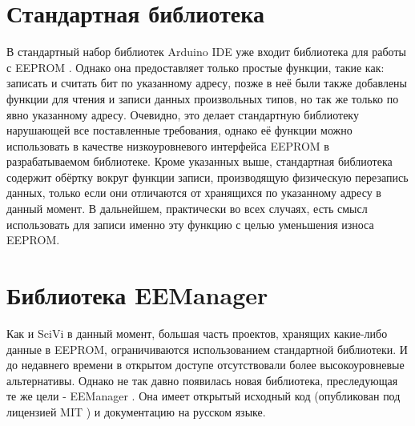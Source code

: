 \section{Стандартная библиотека}

В стандартный набор библиотек Arduino IDE уже входит библиотека для работы с EEPROM \cite{web:arduino-eeprom}.
Однако она предоставляет только простые функции, такие как: записать и считать бит по указанному адресу, позже в неё были также добавлены функции для чтения и записи данных произвольных типов, но так же только по явно указанному адресу.
Очевидно, это делает стандартную библиотеку нарушающей все поставленные требования, однако её функции можно использовать в качестве низкоуровневого интерфейса EEPROM в разрабатываемом библиотеке.
Кроме указанных выше, стандартная библиотека содержит обёртку вокруг функции записи, производящую физическую перезапись данных, только если они отличаются от
хранящихся по указанному адресу в данный момент.
В дальнейшем, практически во всех случаях, есть смысл использовать для записи именно эту функцию с целью уменьшения износа EEPROM.


\section{Библиотека EEManager}

Как и SciVi в данный момент, большая часть проектов, хранящих какие-либо данные в EEPROM, ограничиваются использованием стандартной библиотеки.
И до недавнего времени в открытом доступе отсутствовали более высокоуровневые альтернативы.
Однако не так давно появилась новая библиотека, преследующая те же цели - EEManager \cite{web:eemanager}.
Она имеет открытый исходный код (опубликован под лицензией MIT \cite{web:MIT}) и документацию на русском языке.

